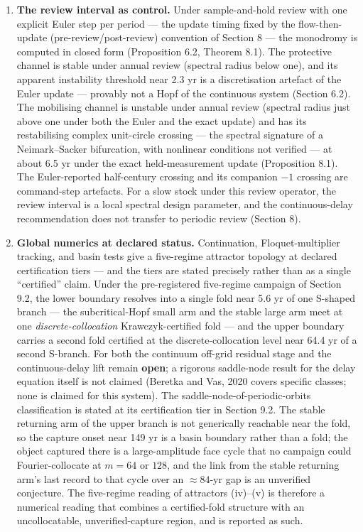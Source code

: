 \documentclass[11pt]{article}
\begin{document}
\begin{enumerate}
\item
  \textbf{The review interval as control.} Under sample-and-hold review
  with one explicit Euler step per period --- the update timing fixed by
  the flow-then-update (pre-review/post-review) convention of Section 8
  --- the monodromy is computed in closed form (Proposition 6.2, Theorem
  8.1). The protective channel is stable under annual review (spectral
  radius below one), and its apparent instability threshold near 2.3 yr
  is a discretisation artefact of the Euler update --- provably not a
  Hopf of the continuous system (Section 6.2). The mobilising channel is
  unstable under annual review (spectral radius just above one under
  both the Euler and the exact update) and has its restabilising complex
  unit-circle crossing --- the spectral signature of a Neimark--Sacker
  bifurcation, with nonlinear conditions not verified --- at about 6.5
  yr under the exact held-measurement update (Proposition 8.1). The
  Euler-reported half-century crossing and its companion \(-1\) crossing
  are command-step artefacts. For a slow stock under this review
  operator, the review interval is a local spectral design parameter,
  and the continuous-delay recommendation does not transfer to periodic
  review (Section 8).
\item
  \textbf{Global numerics at declared status.} Continuation,
  Floquet-multiplier tracking, and basin tests give a five-regime
  attractor topology at declared certification tiers --- and the tiers
  are stated precisely rather than as a single ``certified'' claim.
  Under the pre-registered five-regime campaign of Section 9.2, the
  lower boundary resolves into a single fold near 5.6 yr of one S-shaped
  branch --- the subcritical-Hopf small arm and the stable large arm
  meet at one \emph{discrete-collocation} Krawczyk-certified fold ---
  and the upper boundary carries a second fold certified at the
  discrete-collocation level near 64.4 yr of a second S-branch. For both
  the continuum off-grid residual stage and the continuous-delay lift
  remain \textbf{open}; a rigorous saddle-node result for the delay
  equation itself is not claimed (Beretka and Vas, 2020 covers specific
  classes; none is claimed for this system). The
  saddle-node-of-periodic-orbits classification is stated at its
  certification tier in Section 9.2. The stable returning arm of the
  upper branch is not generically reachable near the fold, so the
  capture onset near 149 yr is a basin boundary rather than a fold; the
  object captured there is a large-amplitude face cycle that no campaign
  could Fourier-collocate at \(m = 64\) or \(128\), and the link from
  the stable returning arm's last record to that cycle over an
  \(\approx 84\)-yr gap is an unverified conjecture. The five-regime
  reading of attractors (iv)--(v) is therefore a numerical reading that
  combines a certified-fold structure with an uncollocatable,
  unverified-capture region, and is reported as such.
\end{enumerate}
\end{document}
